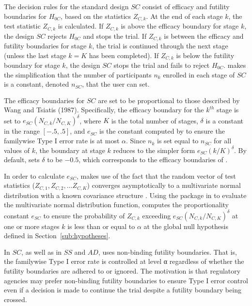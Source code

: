 \documentclass[article]{jss}
\begin{document}
The decision rules for the standard design $SC$ consist of efficacy and futility boundaries for $H_{0C}$, based on the statistics $Z_{C,k}$. At the end of each stage $k$,  the test statistic $Z_{C,k}$ is calculated. If $Z_{C,k}$ is above the efficacy boundary for stage $k$, the design $SC$ rejects $H_{0C}$ and stops the trial. If $Z_{C,k}$ is between the efficacy and futility boundaries for stage $k$, the trial is continued through the next stage (unless the last stage $k=K$ has been completed). If $Z_{C,k}$ is below the futility boundary for stage $k$, the design $SC$ stops the trial and fails to reject $H_{0C}$.  makes the simplification that the number of participants $n_k$ enrolled in each stage of $SC$ is a constant, denoted  $n_{SC}$, that the user can set.

The efficacy boundaries for $SC$ are set to be proportional to those described by Wang and Tsiatis (1987). Specifically, the efficacy boundary for the $k^{th}$ stage is set to $e_{SC}(N_{C,k}/N_{C,K})^{\delta}$, where $K$ is the total number of stages, $δ$ is a constant in the range $[-.5,.5]$, and $e_{SC}$ is the constant computed by    to ensure the familywise Type I error rate is at most $\alpha$. Since $n_{k}$ is set equal to $n_{SC}$ for all values of $k$, the boundary at stage $k$ reduces to the simpler form $e_{SC}(k/K)^\delta$. By default,  sets $\delta$ to be $-0.5$, which corresponds to the efficacy boundaries of \cite{obrienfleming}. %

In order to calculate $e_{SC}$,  makes use of the fact that the random vector of test statistics ($Z_{C,1},Z_{C,2},…Z_{C,K}$) converges asymptotically to a multivariate normal distribution with a known covariance structure \citep{JennisonTurnbullBook}. %
Using the  package \citep{mvtnorm} in  to evaluate the multivariate normal distribution function,  computes the proportionality constant $e_{SC}$ to ensure the probability of $Z_{C,k}$ exceeding $e_{SC}(N_{C,k}/N_{C,K})^{\delta}$ at one or more stages $k$ is less than or equal to $α$ at the global null hypothesis defined in Section~\ref{sub:hypotheses}.

In $SC$, as well as in $SS$ and $AD$,  uses non-binding futility boundaries. That is, the familywise Type I error rate is controlled at level α regardless of whether the futility boundaries are adhered to or ignored. The motivation  is that regulatory agencies may prefer non-binding futility boundaries to ensure Type I error control even if a decision is made to continue the trial despite a futility boundary being crossed.
\end{document}
